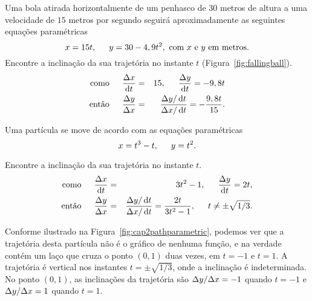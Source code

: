 \begin{example}
Uma bola atirada horizontalmente de um penhasco de $30$ metros de altura
a uma velocidade de $15$ metros por segundo seguirá aproximadamente as
seguintes equações paramétricas
$$
  x = 15t, \hspace{1.5em} y = 30 - 4,9 t^2, \text{ com $x$ e $y$ em metros}.
$$ 
Encontre a inclinação da sua trajetória no instante $t$
(Figura~\ref{fig:fallingball}).
\begin{eqnarray*}
  \text{como} \hspace{1.5em}  \frac{\dx}{\dt} & = & 15, \hspace{1.5em}
    \frac{\dy}{\dt} = -9,8t \\
  \text{então} \hspace{1.5em} \frac{\dy}{\dx} & = & \frac{\dy/\dt}{\dx/\dt} =
    -\frac{9,8t}{15}.
\end{eqnarray*}
\end{example}


\begin{example}
\begin{absolutelynopagebreak}
Uma partícula se move de acordo com as equações paramétricas
$$
  x = t^3 - t, \hspace{1.5em} y = t^2.
$$
\end{absolutelynopagebreak}
Encontre a inclinação da sua trajetória no instante $t$.
\begin{eqnarray*}
  \text{como} \hspace{1.5em} \frac{\dx}{\dt} & = & 3t^2-1,
    \hspace{1.5em} \frac{\dy}{\dt} = 2t, \\
  \text{então} \hspace{1.5em} \frac{\dy}{\dx} & = &
    \frac{\dy/\dt}{\dx/\dt} = \frac{2t}{3t^2 - 1}, \hspace{1.5em}
    t \ne \pm \sqrt{1/3}.
\end{eqnarray*}
\end{example}

Conforme ilustrado na Figura~\ref{fig:cap2pathparametric}, podemos ver
que a trajetória desta partícula não é o gráfico de nenhuma função, e
na verdade contém um laço que cruza o ponto $(0, 1)$ duas vezes, em
$t = -1$ e $t = 1$. A trajetória é vertical nos instantes
$t = \pm \sqrt{1/3}$, onde a inclinação é indeterminada. No ponto
$(0, 1)$, as inclinações da trajetória são $\Delta{y}/\Delta{x} = -1$ quando
$t = -1$ e $\Delta{y}/\Delta{x} = 1$ quando $t = 1$.

